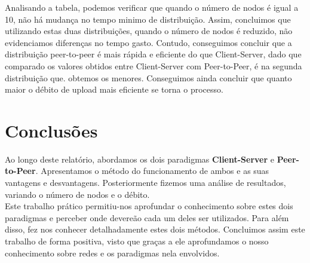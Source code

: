 \documentclass[a4paper, 11pt]{article}
\begin{document}
Analisando a tabela, podemos verificar que quando o número de nodos é igual a 10, não há mudança no tempo minimo de distribuição. Assim, concluimos que utilizando estas duas distribuições, quando o número de nodos é reduzido, não evidenciamos diferenças no tempo gasto.
Contudo, conseguimos concluir que a distribuição peer-to-peer é mais rápida e eficiente do que Client-Server, dado que comparado os valores obtidos entre Client-Server com Peer-to-Peer, é na segunda distribuição que. obtemos os menores.
Conseguimos ainda concluir que quanto maior o débito de upload mais eficiente se torna o processo.

\clearpage

\section {Conclusões}

Ao longo deste relatório, abordamos os dois paradigmas \textbf{Client-Server} e \textbf{Peer-to-Peer}. Apresentamos o método do funcionamento de ambos e as suas vantagens e desvantagens. Posteriormente fizemos uma análise de resultados, variando o número de nodos e o débito.\\

Este trabalho prático permitiu-nos aprofundar o conhecimento sobre estes dois paradigmas e perceber onde devereão cada um deles ser utilizados. Para além disso, fez nos conhecer detalhadamente estes dois métodos. Concluimos assim este trabalho de forma positiva, visto que graças a ele aprofundamos o nosso conhecimento sobre redes e os paradigmas nela envolvidos.
\clearpage
\end{document}
